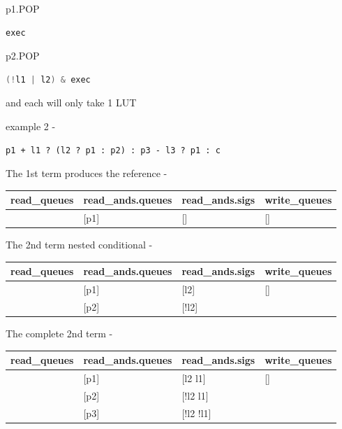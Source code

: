 \documentclass[10pt,a4paper,twoside,fleqn]{book}
\begin{document}
            p1.POP \\
            \begin{lstlisting}[gobble=12, language=C]
            exec
            \end{lstlisting}
            p2.POP \\
            \begin{lstlisting}[gobble=12, language=C]
                (!l1 | l2) & exec
            \end{lstlisting}

            and each will only take 1 LUT


            example 2 -

            \begin{lstlisting}[gobble=12, language=threepl]
                p1 + l1 ? (l2 ? p1 : p2) : p3 - l3 ? p1 : c
            \end{lstlisting}

            The 1st term produces the reference -

            \begin{tabular}{| l | l | l | l |}
            \hline
            read\_queues  & read\_ands.queues & read\_ands.sigs & write\_queues    \\
            \hline
            [p1]         & [p1]             & []              & []              \\
            \hline    
            \end{tabular}

            The 2nd term nested conditional -

            \begin{tabular}{| l | l | l | l |}
            \hline
            read\_queues  & read\_ands.queues & read\_ands.sigs & write\_queues    \\
            \hline
            [p1 p2]      & [p1]             & [l2]            & []              \\
                         & [p2]             & [!l2]           &                 \\
            \hline    
            \end{tabular}

            The complete 2nd term -

            \begin{tabular}{| l | l | l | l |}
            \hline
            read\_queues  & read\_ands.queues & read\_ands.sigs & write\_queues    \\
            \hline
            [p1 p2 p3]   & [p1]             & [l2 l1]         & []              \\
                         & [p2]             & [!l2 l1]        &                 \\
                         & [p3]             & [!l2 !l1]       &                 \\
            \hline    
            \end{tabular}
\end{document}
